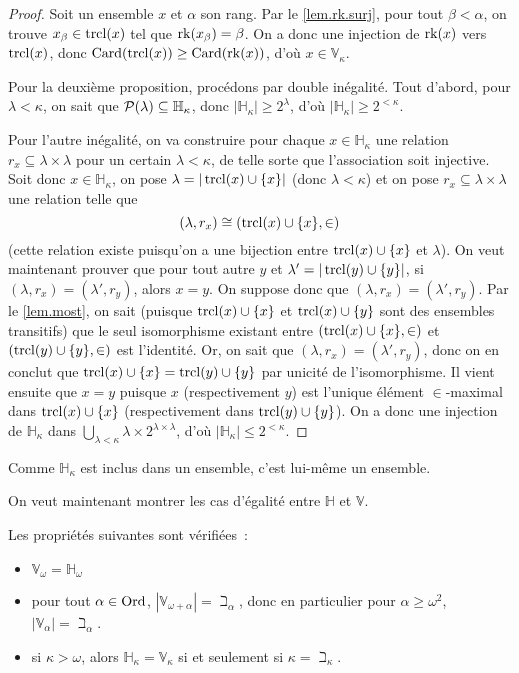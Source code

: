 \begin{proof}
  Soit un ensemble $x$ et $\alpha$ son rang. Par le \cref{lem.rk.surj}, pour
  tout $\beta < \alpha$, on trouve $x_\beta \in \operatorname{trcl}(x)$ tel que
  $\operatorname{rk}(x_\beta) = \beta$. On a donc une injection de $\operatorname{rk}(x)$ vers $\operatorname{trcl}(x)$,
  donc $\operatorname{Card}(\operatorname{trcl}(x)) \geq \operatorname{Card}(\operatorname{rk}(x))$, d'où $x \in \mathbb V_\kappa$.

  Pour la deuxième proposition, procédons par double inégalité. Tout d'abord,
  pour $\lambda < \kappa$, on sait que
  $\mathcal{P}(\lambda) \subseteq \mathbb H_\kappa$, donc
  $|\mathbb H_\kappa| \geq 2^\lambda$, d'où $|\mathbb H_\kappa| \geq 2^{<\kappa}$.

  Pour l'autre inégalité, on va construire pour chaque $x \in \mathbb H_\kappa$
  une relation $r_x \subseteq \lambda \times \lambda$ pour un certain
  $\lambda < \kappa$, de telle sorte que l'association soit injective.
  Soit donc $x \in \mathbb H_\kappa$, on pose $\lambda = |\operatorname{trcl}(x)\cup \{x\}|$
  (donc $\lambda < \kappa$) et on pose $r_x\subseteq \lambda \times \lambda$
  une relation telle que
  \[(\lambda,r_x)\cong (\operatorname{trcl}(x)\cup \{x\}, \in)\]
  (cette relation existe puisqu'on a une bijection entre $\operatorname{trcl}(x)\cup\{x\}$ et
  $\lambda$). On veut maintenant prouver que pour tout autre $y$ et
  $\lambda' = |\operatorname{trcl}(y)\cup\{y\}|$, si $(\lambda, r_x) = (\lambda',r_y)$, alors
  $x = y$. On suppose donc que $(\lambda, r_x) = (\lambda',r_y)$. Par le
  \cref{lem.most}, on sait (puisque $\operatorname{trcl}(x)\cup \{x\}$ et $\operatorname{trcl}(x)\cup \{y\}$
  sont des ensembles transitifs) que le seul isomorphisme existant entre
  $(\operatorname{trcl}(x)\cup \{x\},\in)$ et $(\operatorname{trcl}(y)\cup\{y\},\in)$ est l'identité. Or,
  on sait que $(\lambda,r_x) = (\lambda',r_y)$, donc on en conclut que
  $\operatorname{trcl}(x)\cup \{x\} = \operatorname{trcl}(y)\cup \{y\}$ par unicité de l'isomorphisme.
  Il vient ensuite que $x = y$ puisque $x$ (respectivement $y$) est l'unique
  élément $\in$-maximal dans $\operatorname{trcl}(x)\cup \{x\}$ (respectivement dans
  $\operatorname{trcl}(y)\cup\{y\}$). On a donc une injection de $\mathbb H_\kappa$ dans
  $\displaystyle\bigcup_{\lambda < \kappa}\lambda \times 2^{\lambda \times \lambda}$,
  d'où $|\mathbb H_\kappa| \leq 2^{<\kappa}$.
\end{proof}

Comme $\mathbb H_\kappa$ est inclus dans un ensemble, c'est lui-même un
ensemble.

On veut maintenant montrer les cas d'égalité entre $\mathbb H$ et $\mathbb V$.

\begin{property}
  Les propriétés suivantes sont vérifiées~:
  \begin{itemize}
  \item $\mathbb V_\omega = \mathbb H_\omega$
  \item pour tout $\alpha\in\operatorname{Ord}$, $|\mathbb V_{\omega + \alpha}| = \beth_\alpha$,
    donc en particulier pour $\alpha \geq \omega^2$,
    $|\mathbb V_\alpha| = \beth_\alpha$.
  \item si $\kappa > \omega$, alors $\mathbb H_\kappa = \mathbb V_\kappa$
    si et seulement si $\kappa = \beth_\kappa$.
  \end{itemize}
\end{property}

